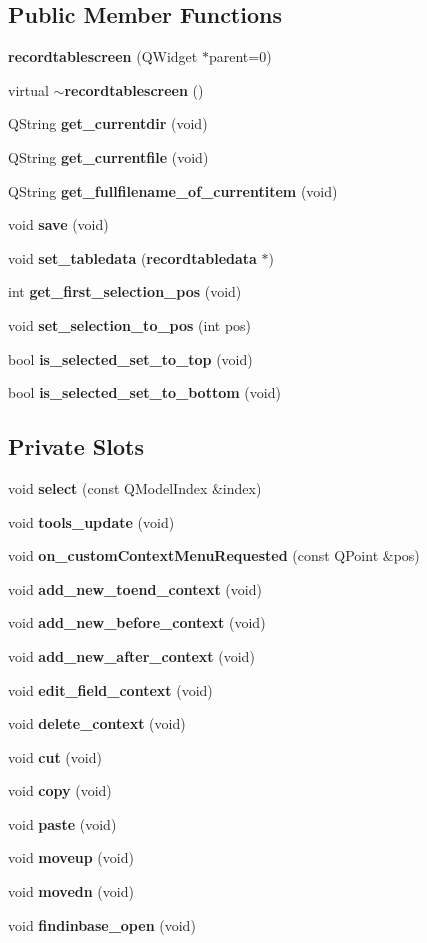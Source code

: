 \subsection*{Public Member Functions}
\begin{CompactItemize}
\item 
{\bf recordtablescreen} (QWidget $\ast$parent=0)
\item 
virtual {\bf $\sim$recordtablescreen} ()
\item 
QString {\bf get\_\-currentdir} (void)
\item 
QString {\bf get\_\-currentfile} (void)
\item 
QString {\bf get\_\-fullfilename\_\-of\_\-currentitem} (void)
\item 
void {\bf save} (void)
\item 
void {\bf set\_\-tabledata} ({\bf recordtabledata} $\ast$)
\item 
int {\bf get\_\-first\_\-selection\_\-pos} (void)
\item 
void {\bf set\_\-selection\_\-to\_\-pos} (int pos)
\item 
bool {\bf is\_\-selected\_\-set\_\-to\_\-top} (void)
\item 
bool {\bf is\_\-selected\_\-set\_\-to\_\-bottom} (void)
\end{CompactItemize}
\subsection*{Private Slots}
\begin{CompactItemize}
\item 
void {\bf select} (const QModel\-Index \&index)
\item 
void {\bf tools\_\-update} (void)
\item 
void {\bf on\_\-custom\-Context\-Menu\-Requested} (const QPoint \&pos)
\item 
void {\bf add\_\-new\_\-toend\_\-context} (void)
\item 
void {\bf add\_\-new\_\-before\_\-context} (void)
\item 
void {\bf add\_\-new\_\-after\_\-context} (void)
\item 
void {\bf edit\_\-field\_\-context} (void)
\item 
void {\bf delete\_\-context} (void)
\item 
void {\bf cut} (void)
\item 
void {\bf copy} (void)
\item 
void {\bf paste} (void)
\item 
void {\bf moveup} (void)
\item 
void {\bf movedn} (void)
\item 
void {\bf findinbase\_\-open} (void)
\end{CompactItemize}
